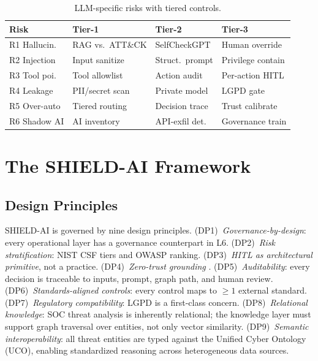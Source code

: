 \documentclass[journal]{IEEEtran}
\begin{document}
\begin{table}[!t]
\renewcommand{\arraystretch}{1.2}
\caption{LLM-specific risks with tiered controls.}
\label{tab:risks}
\centering
\scriptsize
\begin{tabular}{p{1.2cm}p{1.5cm}p{1.5cm}p{1.5cm}}
\toprule
\textbf{Risk} & \textbf{Tier-1} & \textbf{Tier-2} & \textbf{Tier-3} \\
\midrule
R1 Hallucin. & RAG vs.\ ATT\&CK & SelfCheckGPT & Human override \\
R2 Injection & Input sanitize   & Struct.\ prompt & Privilege contain \\
R3 Tool poi. & Tool allowlist   & Action audit  & Per-action HITL \\
R4 Leakage   & PII/secret scan  & Private model & LGPD gate \\
R5 Over-auto & Tiered routing   & Decision trace & Trust calibrate \\
R6 Shadow AI & AI inventory     & API-exfil det. & Governance train \\
\bottomrule
\end{tabular}
\end{table}

\section{The SHIELD-AI Framework}
\label{sec:framework}

\subsection{Design Principles}
SHIELD-AI is governed by nine design principles.
(DP1)~\emph{Governance-by-design}: every operational layer has a governance counterpart in L6.
(DP2)~\emph{Risk stratification}: NIST CSF tiers and OWASP ranking.
(DP3)~\emph{HITL as architectural primitive}, not a practice.
(DP4)~\emph{Zero-trust grounding} \cite{nist2020sp800207}.
(DP5)~\emph{Auditability}: every decision is traceable to inputs, prompt, graph path,
and human review.
(DP6)~\emph{Standards-aligned controls}: every control maps to $\geq 1$ external standard.
(DP7)~\emph{Regulatory compatibility}: LGPD is a first-class concern.
(DP8)~\emph{Relational knowledge}: SOC threat analysis is inherently relational; the knowledge
layer must support graph traversal over entities, not only vector similarity.
(DP9)~\emph{Semantic interoperability}: all threat entities are typed against the
Unified Cyber Ontology (UCO), enabling standardized reasoning across heterogeneous data sources.
\end{document}
